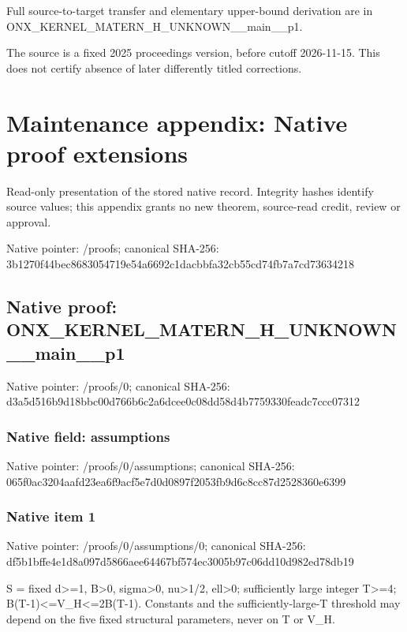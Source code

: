 \documentclass[10pt,a4paper]{article}
\begin{document}
Full source-to-target transfer and elementary upper-bound derivation are in ONX\_\allowbreak{}KERNEL\_\allowbreak{}MATERN\_\allowbreak{}H\_\allowbreak{}UNKNOWN\_\allowbreak{}\_\allowbreak{}main\_\allowbreak{}\_\allowbreak{}p1.

The source is a fixed 2025 proceedings version, before cutoff 2026-11-15. This does not certify absence of later differently titled corrections.

\section{Maintenance appendix: Native proof extensions}
Read-only presentation of the stored native record. Integrity hashes identify source values; this appendix grants no new theorem, source-read credit, review or approval.

Native pointer: /proofs; canonical SHA-256: 3b1270f44bec8683054719e54a6692c1dacbbfa32cb55cd74fb7a7cd73634218

\subsection{Native proof: ONX\_\allowbreak{}KERNEL\_\allowbreak{}MATERN\_\allowbreak{}H\_\allowbreak{}UNKNOWN\_\allowbreak{}\_\allowbreak{}main\_\allowbreak{}\_\allowbreak{}p1}
Native pointer: /proofs/0; canonical SHA-256: d3a5d516b9d18bbc00d766b6c2a6dcee0c08dd58d4b7759330feadc7ccc07312

\subsubsection{Native field: assumptions}
Native pointer: /proofs/0/assumptions; canonical SHA-256: 065f0ac3204aafd23ea6f9acf5e7d0d0897f2053fb9d6c8cc87d2528360e6399

\subsubsection{Native item 1}
Native pointer: /proofs/0/assumptions/0; canonical SHA-256: df5b1bffe4e1d8a097d5866aee64467bf574ec3005b97c06dd10d982ed78db19

\begingroup\raggedright\sloppy S =\allowbreak{} fixed d>=\allowbreak{}1,\allowbreak{} B>0,\allowbreak{} sigma>0,\allowbreak{} nu>1/\allowbreak{}2,\allowbreak{} ell>0;\allowbreak{} sufficiently large integer T>=\allowbreak{}4;\allowbreak{} B(T-1)<=\allowbreak{}V\_\allowbreak{}H<=\allowbreak{}2B(T-1). Constants and the sufficiently-large-T threshold may depend on the five fixed structural parameters,\allowbreak{} never on T or V\_\allowbreak{}H.\par\endgroup
\end{document}
